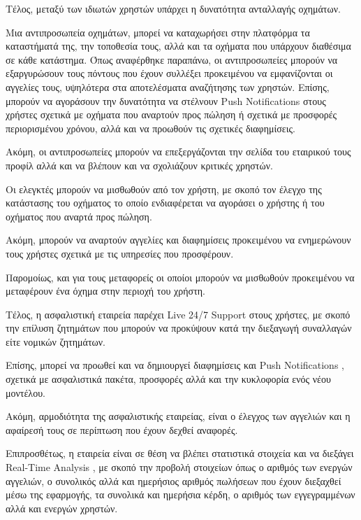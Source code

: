 \documentclass{../ol-softwaremanual}
\begin{document}
	Τέλος, μεταξύ των ιδιωτών χρηστών υπάρχει η δυνατότητα ανταλλαγής οχημάτων. \break
	
	\vspace{5pt}
	
	Μια αντιπροσωπεία οχημάτων, μπορεί να καταχωρήσει στην πλατφόρμα τα καταστήματά της, την τοποθεσία τους, αλλά και τα οχήματα που υπάρχουν διαθέσιμα σε κάθε κατάστημα. \break 
	Όπως αναφέρθηκε παραπάνω, οι αντιπροσωπείες μπορούν να εξαργυρώσουν τους πόντους που έχουν συλλέξει προκειμένου να εμφανίζονται οι αγγελίες τους, υψηλότερα στα αποτελέσματα αναζήτησης των χρηστών. Επίσης, μπορούν να αγοράσουν την δυνατότητα να στέλνουν \en Push Notifications \gr στους χρήστες σχετικά με οχήματα που αναρτούν προς πώληση ή σχετικά με προσφορές περιορισμένου χρόνου, αλλά και να προωθούν τις σχετικές διαφημίσεις. \break
	
	Ακόμη, οι αντιπροσωπείες μπορούν να επεξεργάζονται την σελίδα του εταιρικού τους προφίλ αλλά και να βλέπουν και να σχολιάζουν κριτικές χρηστών.	 \break 
	
	\vspace{5pt}	
	
	Οι ελεγκτές μπορούν να μισθωθούν από τον χρήστη, με σκοπό τον έλεγχο της κατάστασης του οχήματος το οποίο ενδιαφέρεται να αγοράσει ο χρήστης ή του οχήματος που αναρτά προς πώληση. \break
	
	Ακόμη, μπορούν να αναρτούν αγγελίες και διαφημίσεις προκειμένου να ενημερώνουν τους χρήστες σχετικά με τις υπηρεσίες που προσφέρουν.
	
	Παρομοίως, και για τους μεταφορείς οι οποίοι μπορούν να μισθωθούν προκειμένου να μεταφέρουν ένα όχημα στην περιοχή του χρήστη. \break
	
	
	Tέλος, η ασφαλιστική εταιρεία παρέχει \en Live 24/7 Support \gr στους χρήστες, με σκοπό την επίλυση ζητημάτων που μπορούν να προκύψουν κατά την διεξαγωγή συναλλαγών είτε νομικών ζητημάτων. \break
	
	Επίσης, μπορεί να προωθεί και να δημιουργεί διαφημίσεις και \en Push Notifications \gr, σχετικά με ασφαλιστικά πακέτα, προσφορές αλλά και την κυκλοφορία ενός νέου μοντέλου. \break
	
	Ακόμη, αρμοδιότητα της ασφαλιστικής εταιρείας, είναι ο έλεγχος των αγγελιών και η αφαίρεσή τους σε περίπτωση που έχουν δεχθεί αναφορές. \break 
	
	Επιπροσθέτως, η εταιρεία είναι σε θέση να βλέπει στατιστικά στοιχεία και να διεξάγει \en Real-Time Analysis \gr, με σκοπό την προβολή στοιχείων όπως ο αριθμός των ενεργών αγγελιών, ο συνολικός αλλά και ημερήσιος αριθμός πωλήσεων που έχουν διεξαχθεί μέσω της εφαρμογής, τα συνολικά και ημερήσια κέρδη, ο αριθμός των εγγεγραμμένων αλλά και ενεργών χρηστών. \break 
	
\end{document}
